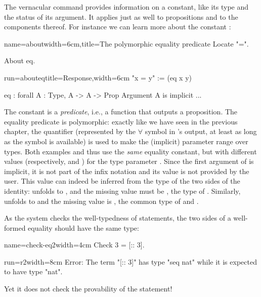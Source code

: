 The  vernacular
command provides information on a constant, like its
type and the status of its argument. It applies just as well to
propositions and to the components thereof. For instance we can learn more
about the constant :

\begin{coq}{name=about}{width=6cm,title=The polymorphic equality predicate}
Locate "=".

About eq.
$~$
\end{coq}
\begin{coqout}{run=abouteq}{title=Response,width=6cm}
"x = y" := (eq x y)

eq : forall A : Type, A -> A -> Prop
Argument A is implicit ...
\end{coqout}

The constant  is a \emph{predicate}, i.e., a function that
outputs a proposition. The equality
predicate is polymorphic: exactly like we have seen in the previous
chapter, the  quantifier (represented by the
$\forall$ symbol in \Coq{}'s output, at least as long as the symbol
is available)
is used to make the (implicit)
parameter  range over types. Both examples  and  thus use the \emph{same} equality constant, but with
different values (respectively,  and ) for the type
parameter . Since the first argument of  is implicit, it is not
part of the infix notation and its value is not
provided by the user. This value can indeed be inferred from the type of the
two sides of the identity:  unfolds to , and
the missing value must be , the type of . Similarly,
 unfolds to 
and the missing value is , the common type of  and
.

As the \Coq{} system checks the well-typedness of statements,
the two sides of a well-formed equality should have the same
type:

\begin{coq}{name=check-eq2}{width=4cm}
Check 3 = [:: 3].
$~$
\end{coq}
\begin{coqout}{run=r2}{width=8cm}
Error: The term "[:: 3]" has type "seq nat"
 while it is expected to have type "nat".
\end{coqout}
Yet it does not check the provability of the statement!

